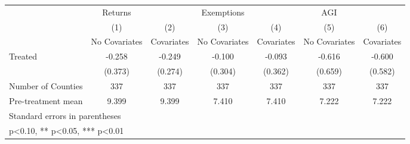 {
\def\sym#1{\ifmmode^{#1}\else\(^{#1}\)\fi}
\begin{tabular}{l*{6}{c}}
\hline\hline
            &     Returns   &               &  Exemptions   &               &         AGI   &               \\
            &\multicolumn{1}{c}{(1)}&\multicolumn{1}{c}{(2)}&\multicolumn{1}{c}{(3)}&\multicolumn{1}{c}{(4)}&\multicolumn{1}{c}{(5)}&\multicolumn{1}{c}{(6)}\\
            &\multicolumn{1}{c}{No Covariates}&\multicolumn{1}{c}{Covariates}&\multicolumn{1}{c}{No Covariates}&\multicolumn{1}{c}{Covariates}&\multicolumn{1}{c}{No Covariates}&\multicolumn{1}{c}{Covariates}\\
\hline
Treated     &      -0.258   &      -0.249   &      -0.100   &      -0.093   &      -0.616   &      -0.600   \\
            &     (0.373)   &     (0.274)   &     (0.304)   &     (0.362)   &     (0.659)   &     (0.582)   \\
\hline
Number of Counties&         337   &         337   &         337   &         337   &         337   &         337   \\
Pre-treatment mean&       9.399   &       9.399   &       7.410   &       7.410   &       7.222   &       7.222   \\
\hline\hline
\multicolumn{7}{l}{\footnotesize Standard errors in parentheses}\\
\multicolumn{7}{l}{\footnotesize * p<0.10, ** p<0.05, *** p<0.01}\\
\end{tabular}
}

